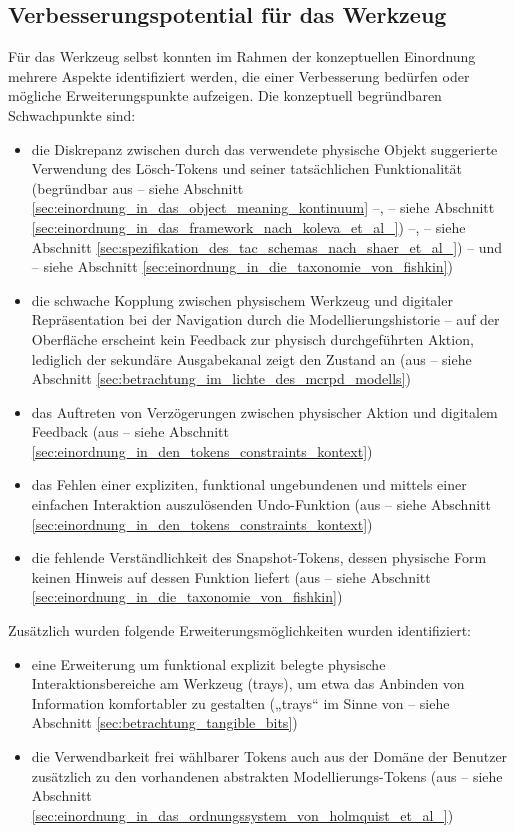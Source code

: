 
\subsection{Verbesserungspotential für das Werkzeug} %
\label{sub:verbesserungspotential_für_das_werkzeug}

Für das Werkzeug selbst konnten im Rahmen der konzeptuellen Einordnung mehrere Aspekte identifiziert werden, die einer Verbesserung bedürfen oder mögliche Erweiterungspunkte aufzeigen. Die konzeptuell begründbaren Schwachpunkte sind:
\begin{itemize}
	\item die Diskrepanz zwischen durch das verwendete physische Objekt suggerierte Verwendung des Lösch-Tokens und seiner tatsächlichen Funktionalität (begründbar aus \citep{Underkoffler99} -- siehe Abschnitt \ref{sec:einordnung_in_das_object_meaning_kontinuum} --, \citep{Koleva03} -- siehe Abschnitt \ref{sec:einordnung_in_das_framework_nach_koleva_et_al_}) --, \citep{Shaer04} -- siehe Abschnitt \ref{sec:spezifikation_des_tac_schemas_nach_shaer_et_al_}) -- und \citep{Fishkin04} -- siehe Abschnitt \ref{sec:einordnung_in_die_taxonomie_von_fishkin})
	\item die schwache Kopplung zwischen physischem Werkzeug und digitaler Repräsentation bei der Navigation durch die Modellierungshistorie -- auf der Oberfläche erscheint kein Feedback zur physisch durchgeführten Aktion, lediglich der sekundäre Ausgabekanal zeigt den Zustand an (aus \citep{Ullmer00} -- siehe Abschnitt \ref{sec:betrachtung_im_lichte_des_mcrpd_modells})
	\item das Auftreten von Verzögerungen zwischen physischer Aktion und digitalem Feedback (aus \citep{Bellotti02} -- siehe Abschnitt \ref{sec:einordnung_in_den_tokens_constraints_kontext})
	\item das Fehlen einer expliziten, funktional ungebundenen und mittels einer einfachen Interaktion auszulösenden Undo-Funktion (aus \citep{Bellotti02} -- siehe Abschnitt \ref{sec:einordnung_in_den_tokens_constraints_kontext})
	\item die fehlende Verständlichkeit des Snapshot-Tokens, dessen physische Form keinen Hinweis auf dessen Funktion liefert (aus \citep{Fishkin04} -- siehe Abschnitt \ref{sec:einordnung_in_die_taxonomie_von_fishkin})
\end{itemize}

Zusätzlich wurden folgende Erweiterungsmöglichkeiten wurden identifiziert:
\begin{itemize}
	\item eine Erweiterung um funktional explizit belegte physische Interaktionsbereiche am Werkzeug (trays), um etwa das Anbinden von Information komfortabler zu gestalten („trays“ im Sinne von \citep{Ishii97} -- siehe Abschnitt \ref{sec:betrachtung_tangible_bits})
	\item die Verwendbarkeit frei wählbarer Tokens auch aus der Domäne der Benutzer zusätzlich zu den vorhandenen abstrakten Modellierungs-Tokens (aus \citep{Holmquist99} -- siehe Abschnitt \ref{sec:einordnung_in_das_ordnungssystem_von_holmquist_et_al_})
\end{itemize}


